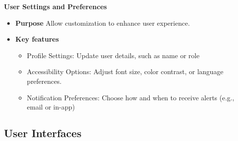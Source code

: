 \documentclass[12pt]{article}
\begin{document}
\textbf{  User Settings and Preferences}
\begin{itemize}
  \item \textbf{Purpose }Allow customization to enhance user experience.
  \item \textbf{Key features}   
	\begin{itemize}
		\item  Profile Settings: Update user details, such as name or role
		\item  Accessibility Options: Adjust font size, color contrast, or language preferences.
		\item   Notification Preferences: Choose how and when to receive alerts (e.g., email or in-app)
	\end{itemize}
\end{itemize}




\subsection{User Interfaces}
\end{document}
